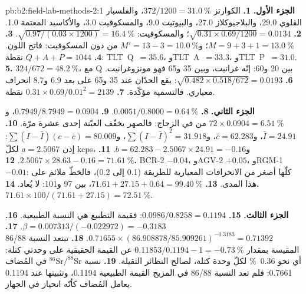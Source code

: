 \begin{solution}{pb:b2:field-lab-methods-2:1}
\noindent\textbf{الجزء الأول.}
\textbf{1.} الكوارتز $372/1200 = \qty{31.0}{\percent}$، والفلسبار القلوي 29.0، والبلاجيوكلاز 27.0، والبيوتيت
9.0، والمسكوفيت 3.0، والأكاسيد المعتمة 1.0.
\textbf{2.} $\sqrt{0.31 \times 0.69/1200} = 0.0134$؛ والمسكوفيت: $\sqrt{0.97/(0.03 \times 1200)} =
\qty{16.4}{\percent}$.
\textbf{3.} $M = 9 + 3 + 1 = \qty{13.0}{\percent}$؛ و$M' = 13 - 3 = \qty{10.0}{\percent}$ من دون
المسكوفيت: فاتح اللون.
\textbf{4.} $Q + A + P = 1044$ نقطة: \mbox{\textdir TLT Q $= 35.6$}، و\mbox{\textdir TLT A $= 33.3$}، و\mbox{\textdir TLT P $= 31.0$}.
\textbf{5.} $324/672 = \qty{48.2}{\percent}$، مع Q بين 20 و60: إنّه غرانيت، وبين 35
و65 فهو مونزوغرانيت.
\textbf{6.} $\sqrt{0.482 \times 0.518/672} = 0.0193$: يقع الحدّان عند 35 و65 على بعد 6.9 و8.7
انحراف معياري. فالتسمية مؤكّدة.
\textbf{7.} $0.31 \times 0.69/0.01^2 = 2139$ نقطة.

\noindent\textbf{الجزء الثاني.}
\textbf{8.} $0.0051/0.8000 = \qty{0.64}{\percent}$.
\textbf{9.} $0.7949/8.7949 = 0.0904$، و$72 \times 0.0904 = \qty{6.51}{\percent}$ من  في
الزجاج: فالصهر يخفّف العيّنة إحدى عشرة مرّة.
\textbf{10.} $\bar I = 24.91$، و$\bar c = 62.283$، و$\sum(I - \bar I)^2 = 31.918$، و$\sum(I - \bar I)(c -
\bar c) = 80.009$: إذن $a = 2.5067$ لكلّ \unit{kcps}، و$b = 62.283 - 2.5067 \times 24.91 = -0.16$.
\textbf{11.} $2.5067 \times 28.63 - 0.16 = \qty{71.61}{\percent}$.
\textbf{12.} BCR-2 \mbox{$-0.04$}، وAGV-2 \mbox{$+0.05$}، وRGM-1 \mbox{$-0.01$}: كلّها أصغر من الانحرافات المعيارية
للطريقة (0.1 إلى 0.2)، فالخطّ ملائم على هذا المدى.
\textbf{13.} $71.61 + 27.15 + 0.64 = \qty{99.40}{\percent}$، بين 97 و101: لا يُعاد.
\textbf{14.} $71.61 \times 100/(71.61 + 27.15) = \qty{72.51}{\percent}$.

\noindent\textbf{الجزء الثالث.}
\textbf{15.} $0.0986/0.8258 = 0.1194$: فقيمة التطبيع هي النسبة الطبيعية.
\textbf{16.} $\beta = 0.007313/(-0.022972) = -0.3183$.
\textbf{17.} $0.71655 \times (86.908878/85.909261)^{-0.3183} = 0.71392$.
\textbf{18.} تبتعد النسبة 86/88 المقيسة بمقدار $0.11853/0.1194 - 1 = \qty{-0.73}{\percent}$ عن القيمة الحقيقية
على وحدتي كتلة: أي نحو \qty{0.36}{\percent} لكلّ وحدة كتلة، لصالح النظائر الثقيلة.
\textbf{19.} نسبة $^{86}\mathrm{Sr}/^{88}\mathrm{Sr}$ في المُضاف 0.7661: فلم تعد النسبة 86/88 في المزيج
القيمة الطبيعية 0.1194، وتثبيتها عند 0.1194 يعامل المُضاف كأنّه انحياز في الجهاز.


\end{solution}
